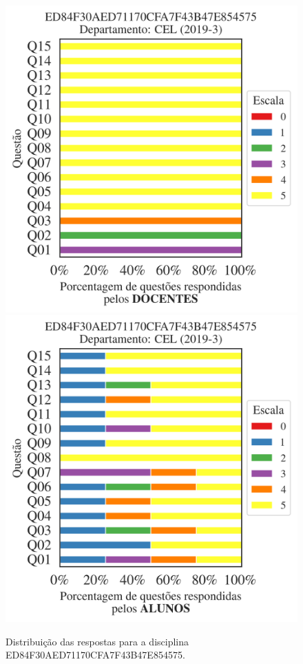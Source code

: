 \documentclass[a4paper,10pt]{article}
\begin{document}
\begin{figure}[h]
\centering
\includegraphics[width=0.485\linewidth]{analise_disciplina_departamento_CEL_ED84F30AED71170CFA7F43B47E854575_docentes.png}
\includegraphics[width=0.485\linewidth]{analise_disciplina_departamento_CEL_ED84F30AED71170CFA7F43B47E854575_alunos.png}
\caption{\label{fig:analise_geral_departamento}                Distribuição das respostas para a disciplina ED84F30AED71170CFA7F43B47E854575. }
\end{figure}
\end{document}
